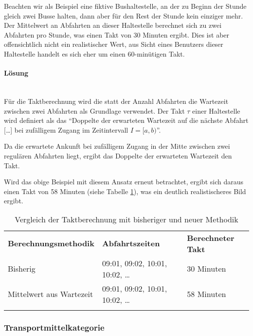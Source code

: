 Beachten wir als Beispiel eine fiktive Bushaltestelle, an der zu Beginn der Stunde gleich zwei Busse halten, dann aber für den Rest der Stunde kein einziger mehr.
Der Mittelwert an Abfahrten an dieser Haltestelle berechnet sich zu zwei Abfahrten pro Stunde, was einen Takt von 30 Minuten ergibt.
Dies ist aber offensichtlich nicht ein realistischer Wert, aus Sicht eines Benutzers dieser Haltestelle handelt es sich eher um einen 60-minütigen Takt.

\paragraph{Lösung}~\\
Für die Taktberechnung wird die statt der Anzahl Abfahrten die Wartezeit zwischen zwei Abfahrten als Grundlage verwendet.
Der Takt $\tau$ einer Haltestelle wird definiert als das "`Doppelte der erwarteten Wartezeit auf die nächste Abfahrt [\ldots] bei zufälligem Zugang im Zeitintervall $I = [a,b)$"'.~\cite{visum_manual_formula}

Da die erwartete Ankunft bei zufälligem Zugang in der Mitte zwischen zwei regulären Abfahrten liegt, ergibt das Doppelte der erwarteten Wartezeit den Takt.

Wird das obige Beispiel mit diesem Ansatz erneut betrachtet, ergibt sich daraus einen Takt von 58 Minuten (siehe Tabelle \ref{table:Vergleich der Taktberechnung mit bisheriger und neuer Methodik}), was ein deutlich realistischeres Bild ergibt.

\begin{longtable}[ht]{l l l}
    \midrule
    \textbf{Berechnungsmethodik}
                             & \textbf{Abfahrtszeiten}
                                                            & \textbf{Berechneter Takt}\\
    Bisherig &                 09:01, 09:02, 10:01, 10:02, \dots & 30 Minuten \\
    Mittelwert aus Wartezeit & 09:01, 09:02, 10:01, 10:02, \dots & 58 Minuten \\
    \bottomrule
\caption{Vergleich der Taktberechnung mit bisheriger und neuer Methodik}
\label{table:Vergleich der Taktberechnung mit bisheriger und neuer Methodik}
\end{longtable}


\subsubsection{Transportmittelkategorie}
\label{Verbesserungsmöglichkeiten:Transportmittelkategorie}

